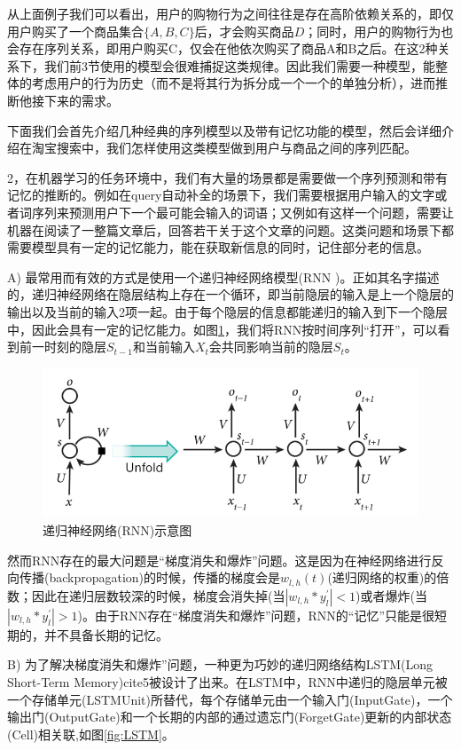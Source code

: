 从上面例子我们可以看出，用户的购物行为之间往往是存在高阶依赖关系的，即仅用户购买了一个商品集合$\{A, B, C\}$后，才会购买商品$D$；同时，用户的购物行为也会存在序列关系，即用户购买C，仅会在他依次购买了商品A和B之后。在这2种关系下，我们前3节使用的模型会很难捕捉这类规律。因此我们需要一种模型，能整体的考虑用户的行为历史（而不是将其行为拆分成一个一个的单独分析），进而推断他接下来的需求。

下面我们会首先介绍几种经典的序列模型以及带有记忆功能的模型，然后会详细介绍在淘宝搜索中，我们怎样使用这类模型做到用户与商品之间的序列匹配。

2，在机器学习的任务环境中，我们有大量的场景都是需要做一个序列预测和带有记忆的推断的。例如在query自动补全的场景下，我们需要根据用户输入的文字或者词序列来预测用户下一个最可能会输入的词语；又例如有这样一个问题，需要让机器在阅读了一整篇文章后，回答若干关于这个文章的问题。这类问题和场景下都需要模型具有一定的记忆能力，能在获取新信息的同时，记住部分老的信息。

A) 最常用而有效的方式是使用一个递归神经网络模型(RNN \cite{4,5})。正如其名字描述的，递归神经网络在隐层结构上存在一个循环，即当前隐层的输入是上一个隐层的输出以及当前的输入2项一起。由于每个隐层的信息都能递归的输入到下一个隐层中，因此会具有一定的记忆能力。如图\ref{fig:RNN}，我们将RNN按时间序列“打开”，可以看到前一时刻的隐层$S_{t-1}$和当前输入$X_t$会共同影响当前的隐层$S_{t}$。

\begin{figure}
	\centering
	\includegraphics[width=0.8\linewidth]{"fig/RNN"}
	\caption{递归神经网络(RNN)示意图}
	\label{fig:RNN}
\end{figure}	

然而RNN存在的最大问题是“梯度消失和爆炸”问题\cite{6}。这是因为在神经网络进行反向传播(backpropagation)的时候，传播的梯度会是$w_{l,h}(t)$(递归网络的权重)的倍数；因此在递归层数较深的时候，梯度会消失掉(当$|w_{l,h}*y^{'}_{l}|<1$)或者爆炸(当$|w_{l,h}*y^{'}_{l}|>1$)。由于RNN存在“梯度消失和爆炸”问题，RNN的“记忆”只能是很短期的，并不具备长期的记忆。

B) 为了解决梯度消失和爆炸”问题，一种更为巧妙的递归网络结构LSTM(Long Short-Term Memory)cite{5}被设计了出来。在LSTM中，RNN中递归的隐层单元被一个存储单元(LSTMUnit)所替代，每个存储单元由一个输入门(InputGate)，一个输出门(OutputGate)和一个长期的内部的通过遗忘门(ForgetGate)更新的内部状态(Cell)相关联,如图\ref{fig:LSTM}。

